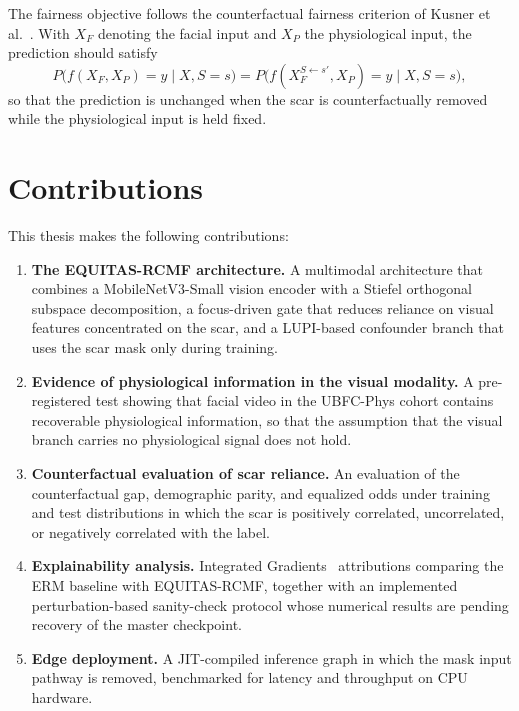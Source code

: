 The fairness objective follows the counterfactual fairness criterion of Kusner et al.~\cite{kusner2017}. With $X_F$ denoting the facial input and $X_P$ the physiological input, the prediction should satisfy
\begin{equation}
P\bigl(f(X_F, X_P) = y \mid X, S = s\bigr) = P\bigl(f(X_F^{S \leftarrow s'}, X_P) = y \mid X, S = s\bigr),
\end{equation}
so that the prediction is unchanged when the scar is counterfactually removed while the physiological input is held fixed.

\section{Contributions}
This thesis makes the following contributions:
\begin{enumerate}
    \item \textbf{The EQUITAS-RCMF architecture.} A multimodal architecture that combines a MobileNetV3-Small vision encoder with a Stiefel orthogonal subspace decomposition, a focus-driven gate that reduces reliance on visual features concentrated on the scar, and a LUPI-based confounder branch that uses the scar mask only during training.
    \item \textbf{Evidence of physiological information in the visual modality.} A pre-registered test showing that facial video in the UBFC-Phys cohort contains recoverable physiological information, so that the assumption that the visual branch carries no physiological signal does not hold.
    \item \textbf{Counterfactual evaluation of scar reliance.} An evaluation of the counterfactual gap, demographic parity, and equalized odds under training and test distributions in which the scar is positively correlated, uncorrelated, or negatively correlated with the label.
    \item \textbf{Explainability analysis.} Integrated Gradients~\cite{sundararajan2017} attributions comparing the ERM baseline with EQUITAS-RCMF, together with an implemented perturbation-based sanity-check protocol whose numerical results are pending recovery of the master checkpoint.
    \item \textbf{Edge deployment.} A JIT-compiled inference graph in which the mask input pathway is removed, benchmarked for latency and throughput on CPU hardware.
\end{enumerate}
